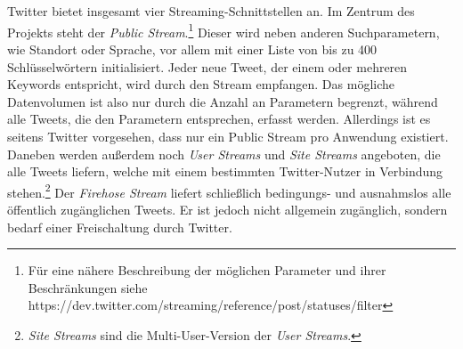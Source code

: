 \\\\
Twitter bietet insgesamt vier Streaming-Schnittstellen an. Im Zentrum des Projekts steht der \textit{Public Stream}.\footnote{Für eine nähere Beschreibung der möglichen Parameter und ihrer Beschränkungen siehe \\ https://dev.twitter.com/streaming/reference/post/statuses/filter} Dieser wird neben anderen Suchparametern, wie Standort oder Sprache, vor allem mit einer Liste von bis zu 400 Schlüsselwörtern initialisiert. Jeder neue Tweet, der einem oder mehreren Keywords entspricht, wird durch den Stream empfangen. Das mögliche Datenvolumen ist also nur durch die Anzahl an Parametern begrenzt, während alle Tweets, die den Parametern entsprechen, erfasst werden. Allerdings ist es seitens Twitter vorgesehen, dass nur ein Public Stream pro Anwendung existiert. Daneben werden außerdem noch \textit{User Streams} und \textit{Site Streams} angeboten, die alle Tweets liefern, welche mit einem bestimmten Twitter-Nutzer in Verbindung stehen.\footnote{\textit{Site Streams} sind die Multi-User-Version der \textit{User Streams}.} Der \textit{Firehose Stream} liefert schließlich bedingungs- und ausnahmslos alle öffentlich zugänglichen Tweets. Er ist jedoch nicht allgemein zugänglich, sondern bedarf einer Freischaltung durch Twitter.
%
